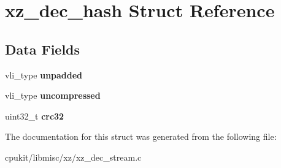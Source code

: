\hypertarget{structxz__dec__hash}{}\section{xz\+\_\+dec\+\_\+hash Struct Reference}
\label{structxz__dec__hash}
\subsection*{Data Fields}
\begin{DoxyCompactItemize}
\item 
\mbox{\label{structxz__dec__hash_a9c5080ff62e3b7517ae3d6d176f97a72}} 
vli\+\_\+type {\bfseries unpadded}
\item 
\mbox{\label{structxz__dec__hash_abed4005f9ca563ca7afcfaa067baac2d}} 
vli\+\_\+type {\bfseries uncompressed}
\item 
\mbox{\label{structxz__dec__hash_a77ef1ef1e8ac907de7e435829cf95931}} 
uint32\+\_\+t {\bfseries crc32}
\end{DoxyCompactItemize}


The documentation for this struct was generated from the following file\+:\begin{DoxyCompactItemize}
\item 
cpukit/libmisc/xz/xz\+\_\+dec\+\_\+stream.\+c\end{DoxyCompactItemize}
